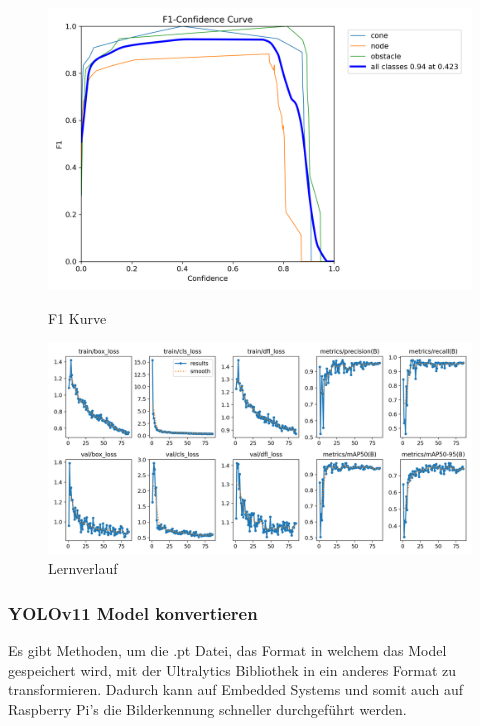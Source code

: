 \begin{figure}[H]
    \begin{minipage}[b]{0.48\textwidth}
    \centering
    \includegraphics[width=\textwidth]{assets/IT/yolo/F1_curve.png}
    \caption{F1 Kurve}
    \label{fig:f1}
  \end{minipage}
    \hfill
  \begin{minipage}[b]{0.48\textwidth}
    \centering
    \includegraphics[width=\textwidth]{assets/IT/yolo/results.png}
    \caption{Lernverlauf}
    \label{fig:results-lernverlauf}
  \end{minipage}
\end{figure}

\subsubsection{YOLOv11 Model konvertieren}
\label{convert-yolo}

Es gibt Methoden, um die .pt Datei, das Format in welchem das Model gespeichert wird, mit der Ultralytics Bibliothek in ein anderes Format zu transformieren. Dadurch kann auf Embedded Systems und somit auch auf Raspberry Pi's die Bilderkennung schneller durchgeführt werden.

